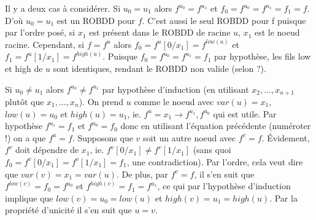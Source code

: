 \documentclass{article}
\begin{document}
Il y a deux cas à considérer. Si $u_0 = u_1$ alors $f^{u_0} = f^{u_1}$ et $f_0 = f^{u_0} = f^{u_1} = f_1 = f$. D'où $u_0 = u_1$ est un ROBDD pour $f$. C'est aussi le seul ROBDD pour f puisque par l'ordre posé, si $x_1$ est présent dans le ROBDD de racine $u$, $x_1$ est le noeud racine. Cependant, si $f = f^u$ alors $f_0  = f^u[0/x_1] = f^{low(u)}$ et $f_1 = f^u[1/x_1] = f^{high(u)}$. Puisque $f_0 = f^{u_0} = f^{u_1} = f_1$ par hypothèse, les fils low et high de $u$ sont identiques, rendant le ROBDD non valide (selon ?).

Si $u_0 \neq u_1$ alors $f^{u_0} \neq f^{u_1}$ par hypothèse d'induction (en utilisant $x_2, \dots, x_{n+1}$ plutôt que $x_1, \dots, x_n$). On prend $u$ comme le noeud avec $var(u) = x_1$, $low(u) = u_0$ et $high(u) = u_1$, ie. $f^u = x_1 \rightarrow f^{u_1}, f^{u_0}$ qui est utile. Par hypothèse $f^{u_1} = f_1$ et $f^{u_0} = f_0$ donc en utilisant l'équation précédente (numéroter !) on a que $f^u = f$. Supposons que $v$ soit un autre noeud avec $f^v = f$. Évidement, $f^v$ doit dépendre de $x_1$, ie. $f^v[0/x_1] \neq f^v[1/x_1]$ (sans quoi $f_0 = f^v[0/x_1] = f^v[1/x_1] = f_1$, une contradiction). Par l'ordre, cela veut dire que $var(v) = x_1 = var(u)$. De plus, par $f^v = f$, il s'en suit que $f^{low(v)} = f_0 = f^{u_0}$ et $f^{high(v)} = f_1 = f^{u_1}$, ce qui par l'hypothèse d'induction implique que $low(v) = u_0 = low(u)$ et $high(v) = u_1 = high(u)$. Par la propriété d'unicité  il s'en suit que $u=v$.
\end{document}
